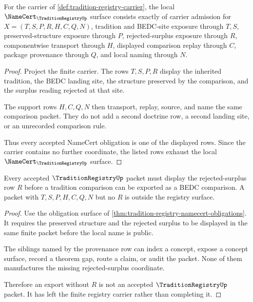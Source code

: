 \begin{theorem}
\label{thm:tradition-registry-namecert-obligations}
For the carrier of \autoref{def:tradition-registry-carrier}, the local $\NameCert_{\TraditionRegistryUp}$ surface consists exactly of carrier admission for $X=(T,S,P,R,H,C,Q,N)$, tradition and BEDC-site exposure through $T,S$, preserved-structure exposure through $P$, rejected-surplus exposure through $R$, componentwise transport through $H$, displayed comparison replay through $C$, package provenance through $Q$, and local naming through $N$.
\end{theorem}
\begin{proof}
Project the finite carrier. The rows $T,S,P,R$ display the inherited tradition, the BEDC landing site, the structure preserved by the comparison, and the surplus reading rejected at that site.

The support rows $H,C,Q,N$ then transport, replay, source, and name the same comparison packet. They do not add a second doctrine row, a second landing site, or an unrecorded comparison rule.

Thus every accepted NameCert obligation is one of the displayed rows. Since the carrier contains no further coordinate, the listed rows exhaust the local $\NameCert_{\TraditionRegistryUp}$ surface.
\end{proof}

\begin{theorem}
\label{thm:tradition-registry-rejected-surplus-nonescape}
Every accepted $\TraditionRegistryUp$ packet must display the rejected-surplus row $R$ before a tradition comparison can be exported as a BEDC comparison. A packet with $T,S,P,H,C,Q,N$ but no $R$ is outside the registry surface.
\end{theorem}
\begin{proof}
Use the obligation surface of \autoref{thm:tradition-registry-namecert-obligations}. It requires the preserved structure and the rejected surplus to be displayed in the same finite packet before the local name is public.

The siblings named by the provenance row can index a concept, expose a concept surface, record a theorem gap, route a claim, or audit the packet. None of them manufactures the missing rejected-surplus coordinate.

Therefore an export without $R$ is not an accepted $\TraditionRegistryUp$ packet. It has left the finite registry carrier rather than completing it.
\end{proof}

